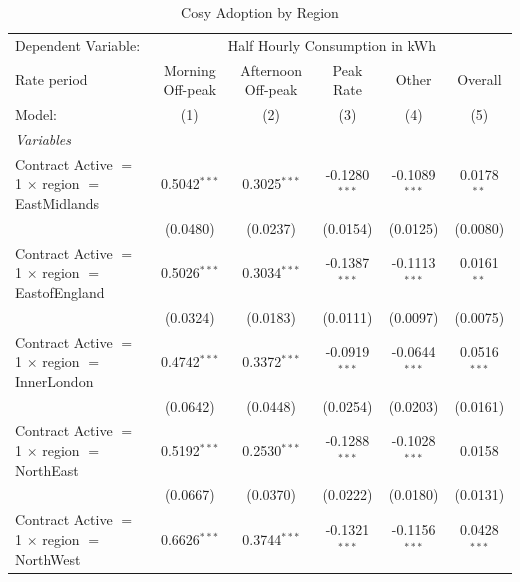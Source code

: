
\begin{table}[htbp]
   \caption{\label{tab:regionaldid} Cosy Adoption by Region}
   \centering
   \begin{tabular}{lccccc}
      \tabularnewline \midrule \midrule
      Dependent Variable: & \multicolumn{5}{c}{Half Hourly Consumption in kWh}\\
      Rate period                                                      & Morning Off-peak & Afternoon Off-peak & Peak Rate       & Other           & Overall \\   
      Model:                                                           & (1)              & (2)                & (3)             & (4)             & (5)\\  
      \midrule
      \emph{Variables}\\
      Contract Active $=$ 1 $\times$ region $=$ EastMidlands           & 0.5042$^{***}$   & 0.3025$^{***}$     & -0.1280$^{***}$ & -0.1089$^{***}$ & 0.0178$^{**}$\\   
                                                                       & (0.0480)         & (0.0237)           & (0.0154)        & (0.0125)        & (0.0080)\\   
      Contract Active $=$ 1 $\times$ region $=$ EastofEngland          & 0.5026$^{***}$   & 0.3034$^{***}$     & -0.1387$^{***}$ & -0.1113$^{***}$ & 0.0161$^{**}$\\   
                                                                       & (0.0324)         & (0.0183)           & (0.0111)        & (0.0097)        & (0.0075)\\   
      Contract Active $=$ 1 $\times$ region $=$ InnerLondon            & 0.4742$^{***}$   & 0.3372$^{***}$     & -0.0919$^{***}$ & -0.0644$^{***}$ & 0.0516$^{***}$\\   
                                                                       & (0.0642)         & (0.0448)           & (0.0254)        & (0.0203)        & (0.0161)\\   
      Contract Active $=$ 1 $\times$ region $=$ NorthEast              & 0.5192$^{***}$   & 0.2530$^{***}$     & -0.1288$^{***}$ & -0.1028$^{***}$ & 0.0158\\   
                                                                       & (0.0667)         & (0.0370)           & (0.0222)        & (0.0180)        & (0.0131)\\   
      Contract Active $=$ 1 $\times$ region $=$ NorthWest              & 0.6626$^{***}$   & 0.3744$^{***}$     & -0.1321$^{***}$ & -0.1156$^{***}$ & 0.0428$^{***}$\\   

\end{tabular}
\end{table}
